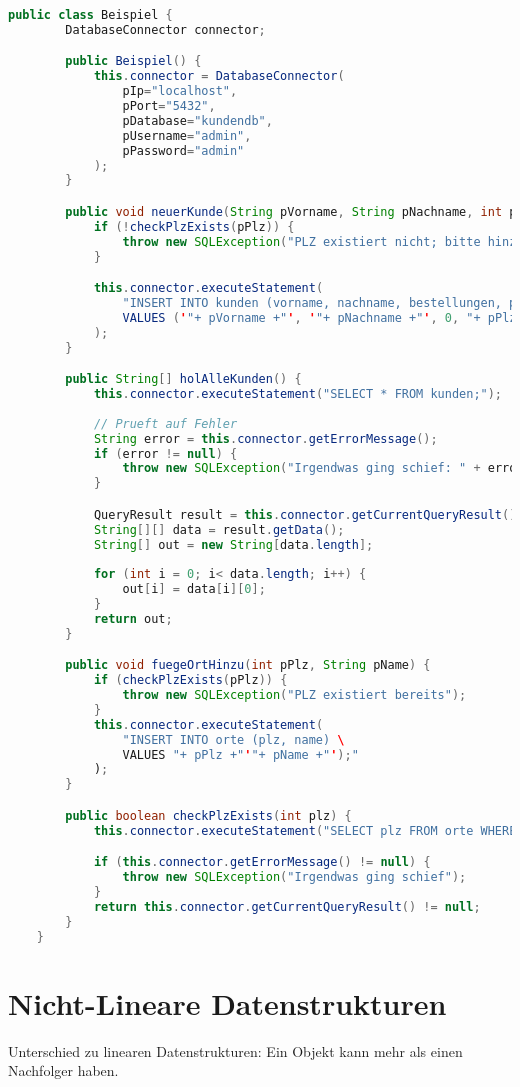 \documentclass{article}
\begin{document}
	\begin{lstlisting}[language=Java]
	public class Beispiel {
		DatabaseConnector connector;

		public Beispiel() {
			this.connector = DatabaseConnector(
				pIp="localhost",
				pPort="5432",
				pDatabase="kundendb",
				pUsername="admin",
				pPassword="admin"
			);
		}

		public void neuerKunde(String pVorname, String pNachname, int pPlz) {
			if (!checkPlzExists(pPlz)) {
				throw new SQLException("PLZ existiert nicht; bitte hinzufuegen");
			}

			this.connector.executeStatement(
				"INSERT INTO kunden (vorname, nachname, bestellungen, plz) \
				VALUES ('"+ pVorname +"', '"+ pNachname +"', 0, "+ pPlz +");"
			);
		}

		public String[] holAlleKunden() {
			this.connector.executeStatement("SELECT * FROM kunden;");
		
			// Prueft auf Fehler
			String error = this.connector.getErrorMessage();
			if (error != null) {
				throw new SQLException("Irgendwas ging schief: " + error);
			}

			QueryResult result = this.connector.getCurrentQueryResult();
			String[][] data = result.getData();
			String[] out = new String[data.length];
		
			for (int i = 0; i< data.length; i++) {
				out[i] = data[i][0];
			}
			return out;
		}

		public void fuegeOrtHinzu(int pPlz, String pName) {
			if (checkPlzExists(pPlz)) {
				throw new SQLException("PLZ existiert bereits");
			}
			this.connector.executeStatement(
				"INSERT INTO orte (plz, name) \
				VALUES "+ pPlz +"'"+ pName +"');"
			);
		}

		public boolean checkPlzExists(int plz) {
			this.connector.executeStatement("SELECT plz FROM orte WHERE plz = " + String.valueOf(plz) + ";");

			if (this.connector.getErrorMessage() != null) {
				throw new SQLException("Irgendwas ging schief");
			}
			return this.connector.getCurrentQueryResult() != null;
		}
	}
	\end{lstlisting}


	\section{Nicht-Lineare Datenstrukturen}
	
	Unterschied zu linearen Datenstrukturen: Ein Objekt kann mehr als einen Nachfolger haben.
	
\end{document}
